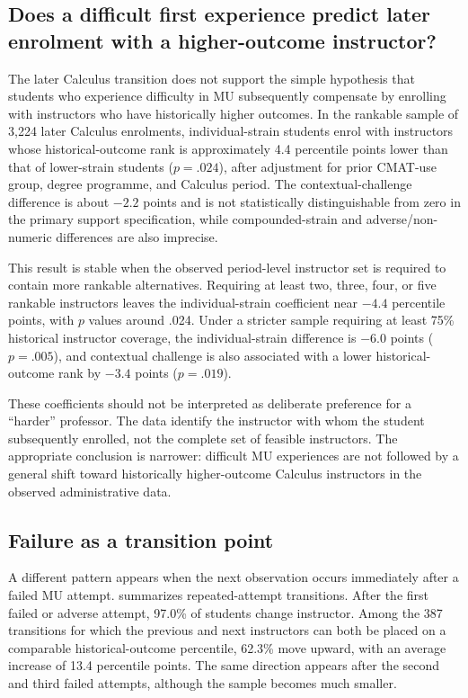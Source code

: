 \subsection{Does a difficult first experience predict later enrolment with a higher-outcome instructor?}

The later Calculus transition does not support the simple hypothesis that students who experience difficulty in MU subsequently compensate by enrolling with instructors who have historically higher outcomes. In the rankable sample of 3,224 later Calculus enrolments, individual-strain students enrol with instructors whose historical-outcome rank is approximately 4.4 percentile points lower than that of lower-strain students ($p=.024$), after adjustment for prior CMAT-use group, degree programme, and Calculus period. The contextual-challenge difference is about $-2.2$ points and is not statistically distinguishable from zero in the primary support specification, while compounded-strain and adverse/non-numeric differences are also imprecise.

This result is stable when the observed period-level instructor set is required to contain more rankable alternatives. Requiring at least two, three, four, or five rankable instructors leaves the individual-strain coefficient near $-4.4$ percentile points, with $p$ values around .024. Under a stricter sample requiring at least 75\% historical instructor coverage, the individual-strain difference is $-6.0$ points ($p=.005$), and contextual challenge is also associated with a lower historical-outcome rank by $-3.4$ points ($p=.019$).

These coefficients should not be interpreted as deliberate preference for a ``harder'' professor. The data identify the instructor with whom the student subsequently enrolled, not the complete set of feasible instructors. The appropriate conclusion is narrower: difficult MU experiences are not followed by a general shift toward historically higher-outcome Calculus instructors in the observed administrative data.

\subsection{Failure as a transition point}

A different pattern appears when the next observation occurs immediately after a failed MU attempt.  summarizes repeated-attempt transitions. After the first failed or adverse attempt, 97.0\% of students change instructor. Among the 387 transitions for which the previous and next instructors can both be placed on a comparable historical-outcome percentile, 62.3\% move upward, with an average increase of 13.4 percentile points. The same direction appears after the second and third failed attempts, although the sample becomes much smaller.

